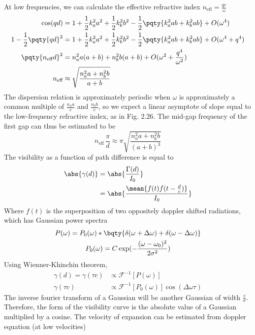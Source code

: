 \documentclass[12pt]{extarticle}
\begin{document}
\begin{outline}[enumerate]
        At low frequencies, we can calculate the effective refractive index \(n_\text{eff}=\frac{qc}{\omega}\)\begin{align*}
            \cos(qd) &=  1 + \frac{1}{2} k_a^2  a^2 + \frac{1}{2} k_b^2 b^2- \frac{1}{2}\pqty{k_a^2ab + k_b^2ab} +  O(\omega^4)\\
            1 - \frac{1}{2}\pqty{qd}^2 &=  1 + \frac{1}{2} k_a^2  a^2 + \frac{1}{2} k_b^2 b^2 - \frac{1}{2}\pqty{k_a^2ab + k_b^2ab} + O(\omega^4 + q^4)\\
            \pqty{n_\text{eff}d }^2 &= n_a^2 a(a + b) + n_b^2 b(a + b) + O(\omega^2 + \frac{q^4}{\omega^2})\\
            n_\text{eff} &\approx  \sqrt{\frac{n_a^2 a + n_b^2b}{a+b} }
        \end{align*}
        The dispersion relation is approximately periodic when \(\omega \) is approximately a common multiple of \(\frac{n_a a}{c}\) and \(\frac{n_b b}{c}\), so we expect a linear asymptote of slope equal to the low-frequency refractive index, as in Fig. 2.26. The mid-gap frequency of the first gap can thus be estimated to be \[
            n_\text{eff}\, \frac{\pi}{d}  \approx  \pi \sqrt{\frac{n_a^2 a + n_b^2b}{(a+b)^3} }
        \]
        \1 The visibility as a function of path difference is equal to 
        \begin{align*}
            \abs{\gamma(d)} &=  \abs{\frac{\Gamma(d)}{I_0}}\\
            &= \abs{\frac{\mean{f(t)f(t - \frac{d}{c})}}{I_0}}
        \end{align*}
        Where \(f(t)\) is the superposition of two oppositely doppler shifted radiations, which has Gaussian power spectra
        \begin{gather*}
            P(\omega) = P_0(\omega) * \bqty{\delta(\omega + \Delta \omega) +\delta(\omega - \Delta \omega)}\\
            P_0 (\omega) = C\exp( - \frac{(\omega - \omega_0)^2}{2\sigma^2})
        \end{gather*}
        Using Wienner-Khinchin theorem,
        \begin{align*}
            \gamma(d) =\gamma(\tau c) &\propto \mathcal{F}^{-1}[P(\omega)] \\
            \gamma(\tau c)&\propto  \mathcal{F}^{-1}[P_0(\omega)] \cos(\Delta\omega \tau)
        \end{align*}
        The inverse fourier transform of a Gaussian will be another Gaussian of width  \(\frac{c}{\sigma}\). Therefore, the form of the visibility curve is the absolute value of a Gaussian multiplied by a cosine. The velocity of expansion can be estimated from doppler equation (at low velocities)\begin{align*}

\end{align*}
\end{outline}
\end{document}
